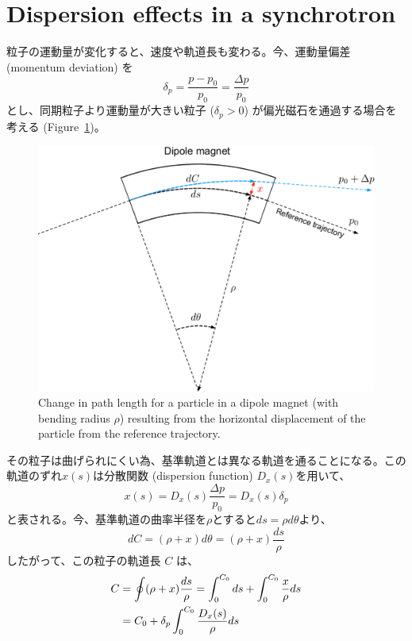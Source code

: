 \documentclass[10pt,a4paper]{ltjsarticle}
\begin{document}
\section{Dispersion effects in a synchrotron}
粒子の運動量が変化すると、速度や軌道長も変わる。今、運動量偏差 (momentum deviation) を
%
\begin{equation}
    \delta_p = \frac{p-p_0}{p_0}=\frac{\Delta p}{p_0}
\end{equation}
%
とし、同期粒子より運動量が大きい粒子 ($\delta_p >0$) が偏光磁石を通過する場合を考える (Figure~\ref{dispersion})。
%
\begin{figure}[hbt]
    \begin{center}
      \includegraphics[width=15cm,clip]{dispersion.pdf}
      \caption{Change in path length for a particle in a dipole magnet (with bending radius $\rho$) resulting from the horizontal displacement of the particle from the reference trajectory.}
      \label{dispersion}
    \end{center}
\end{figure}
%
その粒子は曲げられにくい為、基準軌道とは異なる軌道を通ることになる。この軌道のずれ$x(s)$は分散関数 (dispersion function) $D_x(s)$を用いて、
%
\begin{equation}
    x(s) = D_x(s)\frac{\Delta p}{p_0} = D_x(s)\delta_p 
\end{equation}
%
と表される。今、基準軌道の曲率半径を$\rho$とすると$ds = \rho d\theta$より、
%
\begin{equation}
    dC = (\rho + x) d\theta = (\rho + x) \frac{ds}{\rho}
\end{equation}
%
したがって、この粒子の軌道長 $C$ は、
%
\begin{align}
    C &= \oint (\rho + x)\frac{ds}{\rho} = \int_0^{C_0} ds + \int_0^{C_0}\frac{x}{\rho} ds \notag \\
    &= C_0 + \delta_p \int_0^{C_0}\frac{D_x(s)}{\rho} ds
\end{align}
\end{document}

